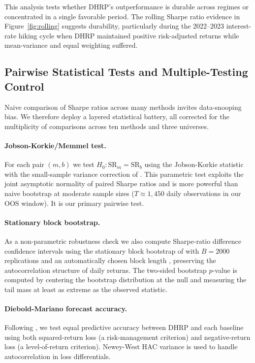 This analysis tests whether DHRP's outperformance is durable across regimes or concentrated in a single favorable period. The rolling Sharpe ratio evidence in Figure~\ref{fig:rolling} suggests durability, particularly during the 2022--2023 interest-rate hiking cycle when DHRP maintained positive risk-adjusted returns while mean-variance and equal weighting suffered.

\subsection{Pairwise Statistical Tests and Multiple-Testing Control}

Naive comparison of Sharpe ratios across many methods invites data-snooping bias. We therefore deploy a layered statistical battery, all corrected for the multiplicity of comparisons across ten methods and three universes.

\paragraph{Jobson-Korkie/Memmel test.} For each pair $(m, b)$ we test $H_0: \text{SR}_m = \text{SR}_b$ using the Jobson-Korkie statistic \citep{JobsonKorkie1981} with the small-sample variance correction of \citet{Memmel2003}. This parametric test exploits the joint asymptotic normality of paired Sharpe ratios and is more powerful than naive bootstrap at moderate sample sizes ($T \approx 1{,}450$ daily observations in our OOS window). It is our primary pairwise test.

\paragraph{Stationary block bootstrap.} As a non-parametric robustness check we also compute Sharpe-ratio difference confidence intervals using the stationary block bootstrap of \citet{PolitisRomano1994} with $B = 2000$ replications and an automatically chosen block length \citep{PolitisWhite2004}, preserving the autocorrelation structure of daily returns. The two-sided bootstrap $p$-value is computed by centering the bootstrap distribution at the null and measuring the tail mass at least as extreme as the observed statistic.

\paragraph{Diebold-Mariano forecast accuracy.} Following \citet{DieboldMariano1995}, we test equal predictive accuracy between DHRP and each baseline using both squared-return loss (a risk-management criterion) and negative-return loss (a level-of-return criterion). Newey-West HAC variance is used to handle autocorrelation in loss differentials.

